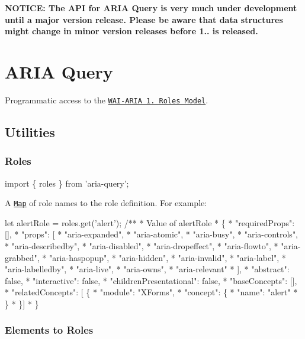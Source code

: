 \href{https://travis-ci.org/A11yance/aria-query}{\tt }

{\bfseries N\+O\+T\+I\+CE\+: The A\+PI for A\+R\+IA Query is very much under development until a major version release. Please be aware that data structures might change in minor version releases before 1.. is released.}

\section*{A\+R\+IA Query}

Programmatic access to the \href{https://www.w3.org/TR/wai-aria-1.1/#roles}{\tt W\+A\+I-\/\+A\+R\+IA 1. Roles Model}.

\subsection*{Utilities}

\subsubsection*{Roles}


\begin{DoxyCode}
import \{ roles \} from 'aria-query';
\end{DoxyCode}


A \href{https://developer.mozilla.org/en-US/docs/Web/JavaScript/Reference/Global_Objects/Map}{\tt Map} of role names to the role definition. For example\+:


\begin{DoxyCode}
let alertRole = roles.get('alert');
/**
 * Value of alertRole
 * \{
 *   "requiredProps": [],
 *   "props": [
 *     "aria-expanded",
 *     "aria-atomic",
 *     "aria-busy",
 *     "aria-controls",
 *     "aria-describedby",
 *     "aria-disabled",
 *     "aria-dropeffect",
 *     "aria-flowto",
 *     "aria-grabbed",
 *     "aria-haspopup",
 *     "aria-hidden",
 *     "aria-invalid",
 *     "aria-label",
 *     "aria-labelledby",
 *     "aria-live",
 *     "aria-owns",
 *     "aria-relevant"
 *   ],
 *   "abstract": false,
 *   "interactive": false,
 *   "childrenPresentational": false,
 *   "baseConcepts": [],
 *   "relatedConcepts": [ \{
 *     "module": "XForms",
 *     "concept": \{
 *       "name": "alert"
 *     \}
 *   \}]
 * \}
\end{DoxyCode}


\subsubsection*{Elements to Roles}


